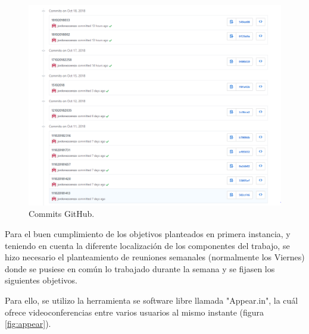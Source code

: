 \begin{figure}[H]
	\center
	\includegraphics[trim = 0mm 0mm 0mm 0mm, clip,scale=0.5]{imagenes/Introduction/CapturaGit}
	\caption{Commits GitHub.}
	\label{fig:capturaGit}
\end{figure}

Para el buen cumplimiento de los objetivos planteados en primera instancia, y teniendo en cuenta la diferente localización de los componentes del trabajo, se hizo necesario el planteamiento de reuniones semanales (normalmente los Viernes) donde se pusiese en común lo trabajado durante la semana y se fijasen los siguientes objetivos. \newline

Para ello, se utilizo la herramienta se software libre llamada "Appear.in", la cuál ofrece videoconferencias entre varios usuarios al mismo instante (figura \ref{fig:appear}). 

